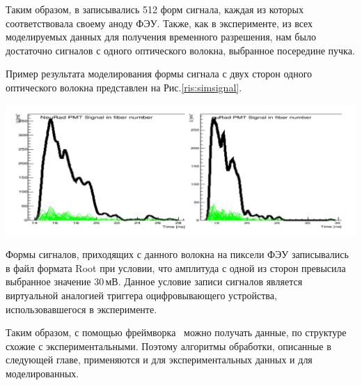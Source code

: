 Таким образом, в записывались 512 форм сигнала, каждая из которых соответствовала своему аноду ФЭУ. Также, как в эксперименте, из всех моделируемых данных для получения временного разрешения, нам было достаточно сигналов с одного оптического волокна, выбранное посередине пучка.

Пример результата моделирования формы сигнала с двух сторон одного оптического волокна представлен на Рис.\ref{ris:simsignal}.

{
	\centering
	\includegraphics[width=\linewidth]{simsignal.png}
	\label{ris:simsignal}
}

Формы сигналов, приходящих с данного волокна на пиксели ФЭУ записывались в файл формата Root \cite{root} при условии, что амплитуда с одной из сторон превысила выбранное значение 30\,мВ. Данное условие записи  сигналов является виртуальной аналогией триггера оцифровывающего устройства, использовавшегося в эксперименте. 

Таким образом, с помощью фреймворка \er\ можно получать данные, по структуре схожие с экспериментальными. Поэтому алгоритмы обработки, описанные в следующей главе, применяются и для экспериментальных данных и для моделированных. 
